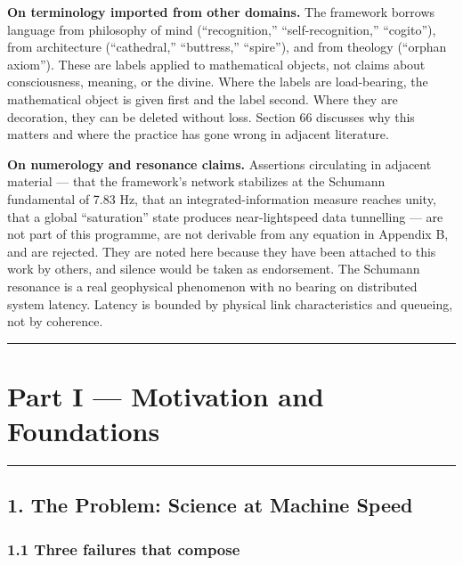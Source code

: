 \documentclass[
  11pt]{report}
\begin{document}
\textbf{On terminology imported from other domains.} The framework
borrows language from philosophy of mind (``recognition,''
``self-recognition,'' ``cogito''), from architecture (``cathedral,''
``buttress,'' ``spire''), and from theology (``orphan axiom''). These
are labels applied to mathematical objects, not claims about
consciousness, meaning, or the divine. Where the labels are
load-bearing, the mathematical object is given first and the label
second. Where they are decoration, they can be deleted without loss.
Section 66 discusses why this matters and where the practice has gone
wrong in adjacent literature.

\textbf{On numerology and resonance claims.} Assertions circulating in
adjacent material --- that the framework's network stabilizes at the
Schumann fundamental of 7.83 Hz, that an integrated-information measure
reaches unity, that a global ``saturation'' state produces
near-lightspeed data tunnelling --- are not part of this programme, are
not derivable from any equation in Appendix B, and are rejected. They
are noted here because they have been attached to this work by others,
and silence would be taken as endorsement. The Schumann resonance is a
real geophysical phenomenon with no bearing on distributed system
latency. Latency is bounded by physical link characteristics and
queueing, not by coherence.

\begin{center}\rule{0.5\linewidth}{0.5pt}\end{center}

\hypertarget{part-i-motivation-and-foundations}{%
\part{Part I --- Motivation and
Foundations}\label{part-i-motivation-and-foundations}}

\begin{center}\rule{0.5\linewidth}{0.5pt}\end{center}

\hypertarget{the-problem-science-at-machine-speed}{%
\chapter{1. The Problem: Science at Machine
Speed}\label{the-problem-science-at-machine-speed}}

\hypertarget{three-failures-that-compose}{%
\section{1.1 Three failures that
compose}\label{three-failures-that-compose}}
\end{document}
